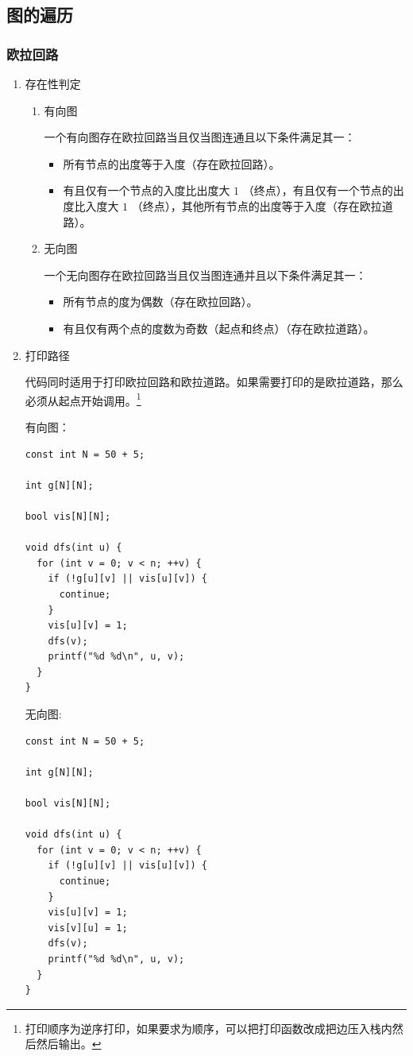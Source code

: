 \documentclass[11pt]{article}
\begin{document}
\subsection{图的遍历}
\label{sec-6-4}
\subsubsection{欧拉回路}
\label{sec-6-4-1}
\begin{enumerate}
\item 存在性判定
\label{sec-6-4-1-1}
\begin{enumerate}
\item 有向图
\label{sec-6-4-1-1-1}

一个有向图存在欧拉回路当且仅当图连通且以下条件满足其一：

\begin{itemize}
\item 所有节点的出度等于入度（存在欧拉回路）。
\item 有且仅有一个节点的入度比出度大 $1$ （终点），有且仅有一个节点的出度比入度大 $1$ （终点），其他所有节点的出度等于入度（存在欧拉道路）。
\end{itemize}

\item 无向图
\label{sec-6-4-1-1-2}

一个无向图存在欧拉回路当且仅当图连通并且以下条件满足其一：

\begin{itemize}
\item 所有节点的度为偶数（存在欧拉回路）。
\item 有且仅有两个点的度数为奇数（起点和终点）（存在欧拉道路）。
\end{itemize}
\end{enumerate}
\item 打印路径
\label{sec-6-4-1-2}

代码同时适用于打印欧拉回路和欧拉道路。如果需要打印的是欧拉道路，那么必须从起点开始调用。\footnote{打印顺序为逆序打印，如果要求为顺序，可以把打印函数改成把边压入栈内然后然后输出。}

有向图：

\begin{verbatim}
const int N = 50 + 5;

int g[N][N];

bool vis[N][N];

void dfs(int u) {
  for (int v = 0; v < n; ++v) {
    if (!g[u][v] || vis[u][v]) {
      continue;
    }
    vis[u][v] = 1;
    dfs(v);
    printf("%d %d\n", u, v);
  }
}
\end{verbatim}

无向图:

\begin{verbatim}
const int N = 50 + 5;

int g[N][N];

bool vis[N][N];

void dfs(int u) {
  for (int v = 0; v < n; ++v) {
    if (!g[u][v] || vis[u][v]) {
      continue;
    }
    vis[u][v] = 1;
    vis[v][u] = 1;
    dfs(v);
    printf("%d %d\n", u, v);
  }
}
\end{verbatim}
\end{enumerate}
\end{document}

